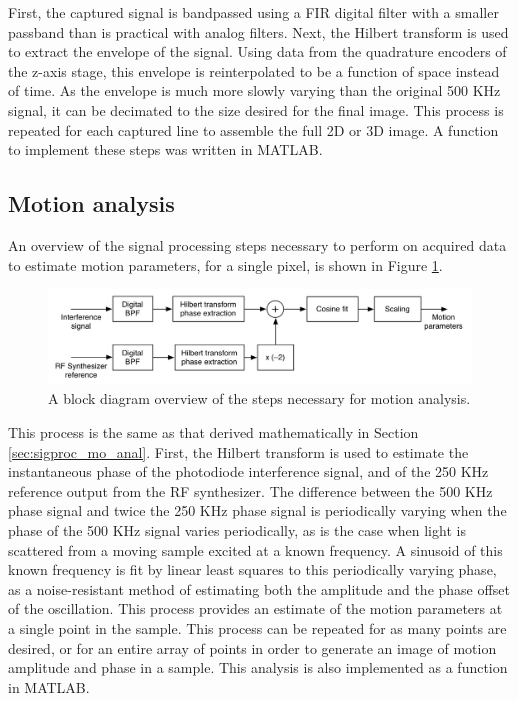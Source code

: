 First, the captured signal is bandpassed using a FIR digital filter with a smaller passband than is practical with analog filters. Next, the Hilbert transform is used to extract the envelope of the signal. Using data from the quadrature encoders of the z-axis stage, this envelope is reinterpolated to be a function of space instead of time. As the envelope is much more slowly varying than the original 500 KHz signal, it can be decimated to the size desired for the final image. This process is repeated for each captured line to assemble the full 2D or 3D image. A function to implement these steps was written in MATLAB.

\subsection{Motion analysis}
\label{sec:motion_analysis_2}

An overview of the signal processing steps necessary to perform on acquired data to estimate motion parameters, for a single pixel, is shown in Figure \ref{fig:motion_analysis_block_diagram}.

\begin{figure}[h!]
\centering
\includegraphics[width=1.0\textwidth]{Images/Background/motion_process.png}
\caption{A block diagram overview of the steps necessary for motion analysis. \label{fig:motion_analysis_block_diagram}}
\end{figure}

This process is the same as that derived mathematically in Section \ref{sec:sigproc_mo_anal}. First, the Hilbert transform is used to estimate the instantaneous phase of the photodiode interference signal, and of the 250 KHz reference output from the RF synthesizer. The difference between the 500 KHz phase signal and twice the 250 KHz phase signal is periodically varying when the phase of the 500 KHz signal varies periodically, as is the case when light is scattered from a moving sample excited at a known frequency. A sinusoid of this known frequency is fit by linear least squares to this periodically varying phase, as a noise-resistant method of estimating both the amplitude and the phase offset of the oscillation. This process provides an estimate of the motion parameters at a single point in the sample. This process can be repeated for as many points are desired, or for an entire array of points in order to generate an image of motion amplitude and phase in a sample. This analysis is also implemented as a function in MATLAB.

